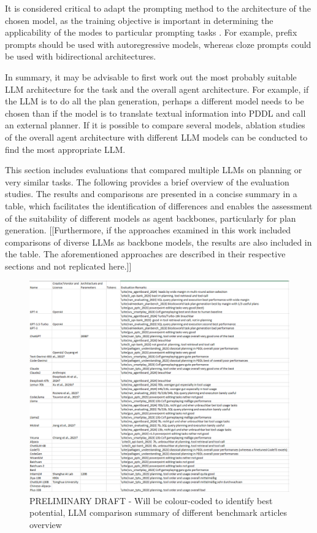\documentclass{article}
\begin{document}
It is considered critical to adapt the prompting method to the architecture of the chosen model, as the training objective is important in determining the applicability of the modes to particular prompting tasks \cite{liu_pre-train_2021}. For example, prefix prompts should be used with autoregressive models, whereas cloze prompts could be used with bidirectional architectures.

In summary, it may be advisable to first work out the most probably suitable LLM architecture for the task and the overall agent architecture. For example, if the LLM is to do all the plan generation, perhaps a different model needs to be chosen than if the model is to translate textual information into PDDL and call an external planner. If it is possible to compare several models, ablation studies of the overall agent architecture with different LLM models can be conducted to find the most appropriate LLM.


This section includes evaluations that compared multiple LLMs on planning or very similar tasks. The following provides a brief overview of the evaluation studies. The results and comparisons are presented in a concise summary in a table, which facilitates the identification of differences and enables the assessment of the suitability of different models as agent backbones, particularly for plan generation. [[Furthermore, if the approaches examined in this work included comparisons of diverse LLMs as backbone models, the results are also included in the table. The aforementioned approaches are described in their respective sections and not replicated here.]]

\begin{figure}[h]
	\centering
	\includegraphics[width=1.0\linewidth]{LLM-Evaluation}
	\caption{PRELIMINARY DRAFT - Will be colour-coded to identify best potential, LLM comparison summary of different benchmark articles overview}
	\label{fig:llm-evaluation}
\end{figure}
\end{document}
